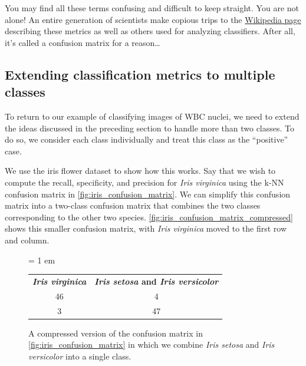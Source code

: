 \begin{qbox}\end{qbox}

You may find all these terms confusing and difficult to keep straight. You are not alone! An entire generation of scientists make copious trips to the \href{https://en.wikipedia.org/wiki/Precision_and_recall#Definition_(classification_context)}{Wikipedia page} describing these metrics as well as others used for analyzing classifiers. After all, it's called a confusion matrix for a reason\ldots

\FloatBarrier
{}
\subsection{Extending classification metrics to multiple classes}

To return to our example of classifying images of WBC nuclei, we need to extend the ideas discussed in the preceding section to handle more than two classes. To do so, we consider each class individually and treat this class as the ``positive'' case.

We use the iris flower dataset to show how this works. Say that we wish to compute the recall, specificity, and precision for \textit{Iris virginica} using the k-NN confusion matrix in \autoref{fig:iris_confusion_matrix}. We can simplify this confusion matrix into a two-class confusion matrix that combines the two classes corresponding to the other two species. \autoref{fig:iris_confusion_matrix_compressed}
 shows this smaller confusion matrix, with \textit{Iris virginica} moved to the first row and column.
 
 \begin{figure}[h]
\centering
\tabcolsep = 1 em
\mySfFamily
\begin{tabular}{c c}
\textbf{\textit{Iris virginica}} & \textbf{\textit{Iris setosa} and \textit{Iris versicolor}} \\
46 & 4 \\
3 & 47 \\
\end{tabular}
\caption{A compressed version of the confusion matrix in \autoref{fig:iris_confusion_matrix} in which we combine \textit{Iris setosa} and \textit{Iris versicolor} into a single class.}
\label{fig:iris_confusion_matrix_compressed}
\end{figure}

